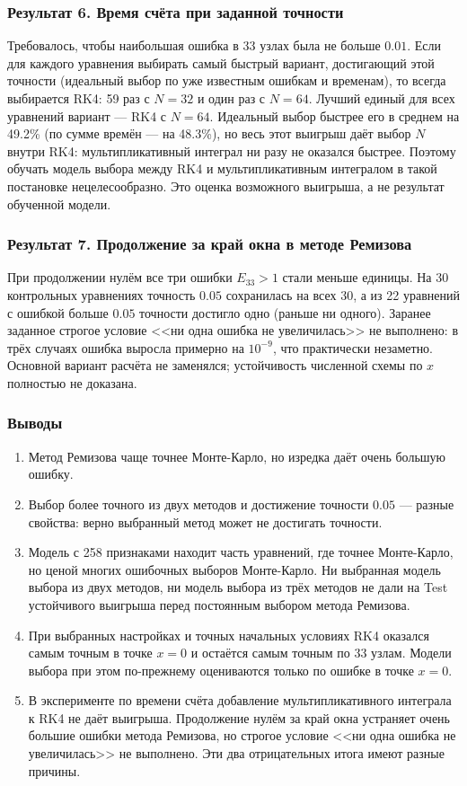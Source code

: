 \documentclass[14pt,a4paper]{extarticle}
\begin{document}
\subsubsection*{Результат 6. Время счёта при заданной точности}
Требовалось, чтобы наибольшая ошибка в 33 узлах была не больше $0.01$.
Если для каждого уравнения выбирать самый быстрый вариант, достигающий
этой точности (идеальный выбор по уже известным ошибкам и временам), то
всегда выбирается RK4: 59 раз с $N=32$ и один раз с $N=64$. Лучший
единый для всех уравнений вариант --- RK4 с $N=64$. Идеальный выбор
быстрее его в среднем на 49.2\% (по сумме времён --- на 48.3\%), но
весь этот выигрыш даёт выбор $N$ внутри RK4: мультипликативный
интеграл ни разу не оказался быстрее. Поэтому обучать модель выбора
между RK4 и мультипликативным интегралом в такой постановке
нецелесообразно. Это оценка возможного выигрыша, а не результат
обученной модели.

\subsubsection*{Результат 7. Продолжение за край окна в методе Ремизова}
При продолжении нулём все три ошибки $E_{33}>1$ стали меньше единицы.
На 30 контрольных уравнениях точность $0.05$ сохранилась на всех 30,
а из 22 уравнений с ошибкой больше $0.05$ точности достигло одно
(раньше ни одного). Заранее заданное строгое условие <<ни одна ошибка
не увеличилась>> не выполнено: в трёх случаях ошибка выросла примерно
на $10^{-9}$, что практически незаметно. Основной вариант расчёта
не заменялся; устойчивость численной схемы по $x$ полностью
не доказана.

\subsubsection*{Выводы}
\begin{enumerate}
\item Метод Ремизова чаще точнее Монте-Карло, но изредка даёт очень
большую ошибку.
\item Выбор более точного из двух методов и достижение точности $0.05$ ---
разные свойства: верно выбранный метод может не достигать точности.
\item Модель с 258 признаками находит часть уравнений, где точнее
Монте-Карло, но ценой многих ошибочных выборов Монте-Карло. Ни
выбранная модель выбора из двух методов, ни модель выбора из трёх
методов не дали на Test устойчивого выигрыша перед постоянным выбором
метода Ремизова.
\item При выбранных настройках и точных начальных условиях RK4
оказался самым точным в точке $x=0$ и остаётся самым точным по 33
узлам. Модели выбора при этом по-прежнему оцениваются только
по ошибке в точке $x=0$.
\item В эксперименте по времени счёта добавление мультипликативного
интеграла к RK4 не даёт выигрыша. Продолжение нулём за край окна
устраняет очень большие ошибки метода Ремизова, но строгое условие
<<ни одна ошибка не увеличилась>> не выполнено. Эти два отрицательных
итога имеют разные причины.
\end{enumerate}
\endgroup
\clearpage
\tableofcontents
\clearpage
\end{document}
